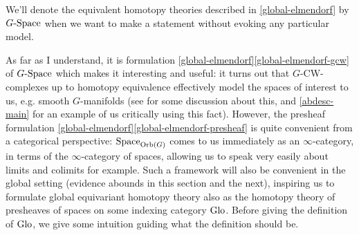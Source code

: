 \begin{notation}
  \label{global-gspace}
  We'll denote the equivalent homotopy theories described in
  \cref{global-elmendorf} by $G\text{-}\mathrm{Space}$ when we want to make a
  statement without evoking any particular model.
\end{notation}

As far as I understand, it is formulation
\cref{global-elmendorf}\cref{global-elmendorf-gcw} of $G\text{-}\mathrm{Space}$
which makes it interesting and useful: it turns out that
$G$-CW-complexes up to homotopy equivalence effectively model the
spaces of interest to us, e.g. smooth $G$-manifolds (see
\cite{mo-equivhmptygrps} for some discussion about this, and
\cref{abdesc-main} for an example of us critically using this
fact). However, the presheaf formulation
\cref{global-elmendorf}\cref{global-elmendorf-presheaf} is quite
convenient from a categorical perspective: $\mathrm{Space}_{\mathrm{Orb}(G)}$ comes to
us immediately as an $\infty$-category, in terms of the
$\infty$-category of spaces, allowing us to speak very easily about
limits and colimits for example. Such a framework will also be
convenient in the global setting (evidence abounds in this section and
the next), inspiring us to formulate global equivariant homotopy
theory also as the homotopy theory of presheaves of spaces on some
indexing category $\mathrm{Glo}$. Before giving the definition of $\mathrm{Glo}$, we
give some intuition guiding what the definition should be.

